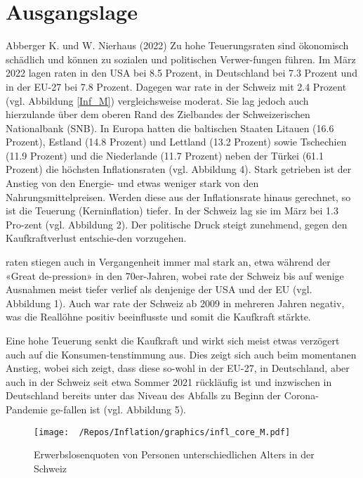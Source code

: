 \documentclass[
]{article}
\begin{document}
\hypertarget{ausgangslage}{%
\section{Ausgangslage}\label{ausgangslage}}

Abberger K. und W. Nierhaus (2022) Zu hohe Teuerungsraten sind
ökonomisch schädlich und können zu sozialen und politischen
Verwer-fungen führen. Im März 2022 lagen raten in den USA bei 8.5
Prozent, in Deutschland bei 7.3 Prozent und in der EU-27 bei 7.8
Prozent. Dagegen war rate in der Schweiz mit 2.4 Prozent (vgl. Abbildung
\ref{Inf_M}) vergleichsweise moderat. Sie lag jedoch auch hierzulande
über dem oberen Rand des Zielbandes der Schweizerischen Nationalbank
(SNB). In Europa hatten die baltischen Staaten Litauen (16.6 Prozent),
Estland (14.8 Prozent) und Lettland (13.2 Prozent) sowie Tschechien
(11.9 Prozent) und die Niederlande (11.7 Prozent) neben der Türkei (61.1
Prozent) die höchsten Inflationsraten (vgl. Abbildung 4). Stark
getrieben ist der Anstieg von den Energie- und etwas weniger stark von
den Nahrungsmittelpreisen. Werden diese aus der Inflationsrate hinaus
gerechnet, so ist die Teuerung (Kerninflation) tiefer. In der Schweiz
lag sie im März bei 1.3 Pro-zent (vgl. Abbildung 2). Der politische
Druck steigt zunehmend, gegen den Kaufkraftverlust entschie-den
vorzugehen.

raten stiegen auch in Vergangenheit immer mal stark an, etwa während der
«Great de-pression» in den 70er-Jahren, wobei rate der Schweiz bis auf
wenige Ausnahmen meist tiefer verlief als denjenige der USA und der EU
(vgl. Abbildung 1). Auch war rate der Schweiz ab 2009 in mehreren Jahren
negativ, was die Reallöhne positiv beeinflusste und somit die Kaufkraft
stärkte.

Eine hohe Teuerung senkt die Kaufkraft und wirkt sich meist etwas
verzögert auch auf die Konsumen-tenstimmung aus. Dies zeigt sich auch
beim momentanen Anstieg, wobei sich zeigt, dass diese so-wohl in der
EU-27, in Deutschland, aber auch in der Schweiz seit etwa Sommer 2021
rückläufig ist und inzwischen in Deutschland bereits unter das Niveau
des Abfalls zu Beginn der Corona-Pandemie ge-fallen ist (vgl. Abbildung
5).

\begin{figure} \centering
\texttt{[image: ~/Repos/Inflation/graphics/infl\_core\_M.pdf]}
\caption{Erwerbslosenquoten von Personen unterschiedlichen Alters in der Schweiz}
\label{Inf_A}
\end{figure}
\end{document}
